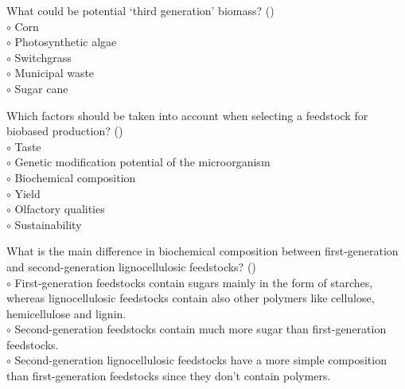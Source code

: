 \documentclass[]{beamer}
\begin{document}
\begin{CJK}{UTF8}{gbsn}
\begin{frame}[shrink] {} 
\addtocounter{questions}{1}
\color{blue}
  What could be potential ‘third generation’ biomass?
 ({})\\
\color{black}
\setlength{\parindent}{-0.4cm}
{\color{red}$\circ$} Corn  \\
{\color{red}$\circ$}  Photosynthetic algae  \\
{\color{red}$\circ$} Switchgrass  \\
{\color{red}$\circ$} Municipal waste  \\
{\color{red}$\circ$} Sugar cane  \\
\end{frame}


\begin{frame}[shrink] {} 
\addtocounter{questions}{1}
\color{blue}
  Which factors should be taken into account when selecting a feedstock for biobased production?
 ({})\\
\color{black}
\setlength{\parindent}{-0.4cm}
{\color{red}$\circ$} Taste  \\
{\color{red}$\circ$} Genetic modification potential of the microorganism  \\
{\color{red}$\circ$}  Biochemical composition  \\
{\color{red}$\circ$}  Yield  \\
{\color{red}$\circ$} Olfactory qualities  \\
{\color{red}$\circ$}  Sustainability  \\
\end{frame}


\begin{frame}[shrink] {} 
\addtocounter{questions}{1}
\color{blue}
  What is the main difference in biochemical composition between first-generation and second-generation lignocellulosic feedstocks? 
 ({})\\
\color{black}
\setlength{\parindent}{-0.4cm}
{\color{red}$\circ$}  First-generation feedstocks contain sugars mainly in the form of starches, whereas lignocellulosic feedstocks contain also other polymers like cellulose, hemicellulose and lignin.   \\
{\color{red}$\circ$} Second-generation feedstocks contain much more sugar than first-generation feedstocks.   \\
{\color{red}$\circ$} Second-generation lignocellulosic feedstocks have a more simple composition than first-generation feedstocks since they don't contain polymers.   \\
\end{frame}



\end{CJK}
\end{document}
